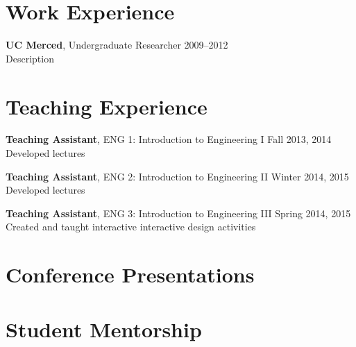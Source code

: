 \documentclass[]{res}
\begin{document}
\begin{resume}
\section{Work Experience}
\vspace{0.1in}
%

\textbf{UC Merced}, Undergraduate Researcher \hfill 2009--2012 \\
Description


\section{Teaching Experience}
\vspace{0.1in}

\textbf{Teaching Assistant}, ENG 1: Introduction to Engineering I \hfill Fall 2013, 2014 \\
Developed lectures

\textbf{Teaching Assistant}, ENG 2: Introduction to Engineering II \hfill Winter 2014, 2015 \\
Developed lectures

\textbf{Teaching Assistant}, ENG 3: Introduction to Engineering III \hfill Spring 2014, 2015 \\
Created and taught interactive interactive design activities


\section{Conference Presentations}
\vspace{0.1in}
%


\section{Student Mentorship}
\vspace{0.1in}
%



\end{resume}
\end{document}
